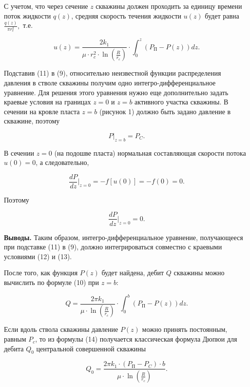 \begin{multicols}{2}
С учетом, что через сечение $z$ скважины должен проходить за
единицу времени поток жидкости $q(z)$, средняя скорость течения
жидкости $u(z)$ будет равна $\frac{q(z)}{\pi r_c^2},$ т.е.

\begin{equation}
u(z)=\frac{2k_1}{\mu\cdot r_c^2\cdot\ln\left(\frac{R}{r_c}\right)}\cdot\int_0^z(P_{\text{П}}-P(z))dz.
\end{equation}

Подставив (11) в (9), относительно неизвестной функции распределения
давления
в
стволе скважины получим одно интегро-дифференциальное уравнение. Для
решения этого уравнения нужно еще дополнительно задать краевые условия
на границах $z=0$ и $z=b$ активного участка скважины. В
сечении на кровле пласта $z=b$ (рисунок 1) должно быть задано
давление в скважине, поэтому

\begin{equation}
P|_{z=b}=P_C.
\end{equation}

В сечении $z=0$ (на подошве пласта) нормальная составляющая
скорости потока $u(0)=0$, а следовательно,

\begin{equation*}
\frac{dP}{dz}|_{z=0}=-f[u(0)]=-f(0)=0.
\end{equation*}

Поэтому

\begin{equation}
\frac{dP}{dz}|_{z=0}=0.
\end{equation}

{\bfseries Выводы.} Таким образом, интегро-дифферен\-циальное уравнение,
получающееся при подставке (11) в (9), должно интегрироваться совместно
с краевыми условиями (12) и (13).

После того, как функция $P(z)$ будет найдена, дебит $Q$ скважины
можно вычислить по формуле (10) при $z=b$:

\begin{equation}
Q=\frac{2\pi k_1}{\mu\cdot\ln\left(\frac{R}{r_c}\right)}\cdot\int_0^b(P_{\text{П}}-P(z))dz.
\end{equation}

Если вдоль ствола скважины давление $P(z)$ можно принять постоянным,
равным $P_c$, то из формулы (14) получается классическая формула Дюпюи
для дебита $Q_0$ центральной совершенной скважины

\begin{equation}
Q_0=\frac{2\pi k_1\cdot (P_{\text{П}}-P_C)\cdot b}{\mu\cdot\ln\left(\frac{R}{r_c}\right)}.
\end{equation}


\end{multicols}
